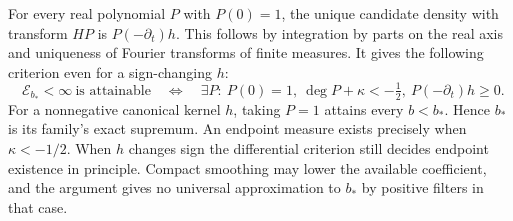 \documentclass[11pt]{article}
\newcommand{\E}{\mathcal E}\newcommand{\F}{\mathcal F}
\begin{document}
For every real polynomial $P$ with $P(0)=1$, the unique candidate density with transform $HP$ is $P(-\partial_t)h$. This follows by integration by parts on the real axis and uniqueness of Fourier transforms of finite measures. It gives the following criterion even for a sign-changing $h$:
\[
 \boxed{\quad \E_{b_*}<\infty\ \text{is attainable}\quad\Longleftrightarrow\quad
 \exists P:\ P(0)=1,\ \deg P+\kappa<-\tfrac12,\ P(-\partial_t)h\ge0.\quad}
\]
For a nonnegative canonical kernel $h$, taking $P=1$ attains every $b<b_*$. Hence $b_*$ is its family's exact supremum. An endpoint measure exists precisely when $\kappa<-1/2$. When $h$ changes sign the differential criterion still decides endpoint existence in principle. Compact smoothing may lower the available coefficient, and the argument gives no universal approximation to $b_*$ by positive filters in that case.
\end{document}
